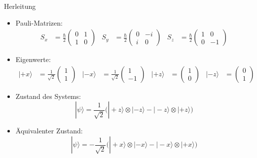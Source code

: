 \documentclass{beamer}
\begin{document}
\begin{frame}{Herleitung}
    \begin{itemize}
        \item Pauli-Matrizen:
            \begin{align*}
                S_x &= \frac{\hbar}{2} \begin{pmatrix}
                0 & 1 \\ 1 & 0
                \end{pmatrix}
                &
                S_y &= \frac{\hbar}{2} \begin{pmatrix}
                0 & -i \\ i & 0
                \end{pmatrix}
                &
                S_z &= \frac{\hbar}{2} \begin{pmatrix}
                1 & 0 \\ 0 & -1
                \end{pmatrix}\label{equ:bell:paulimatrizen}
            \end{align*}
        \item Eigenwerte:
            \begin{align*}
                |{+}x\rangle &= \frac{1}{\sqrt{2}}\begin{pmatrix} 1\\1 \end{pmatrix} &
                |{-}x\rangle &= \frac{1}{\sqrt{2}}\begin{pmatrix} 1\\-1 \end{pmatrix} &
                |{+}z\rangle &= \begin{pmatrix} 1\\0 \end{pmatrix} &
                |{-}z\rangle &= \begin{pmatrix} 0\\1 \end{pmatrix} &
            \end{align*}
        \item<2-> Zustand des Systems:
            \[
                |\psi\rangle = \frac{1}{\sqrt{2}} \Big( 
                    |{+}z\rangle \otimes |{-}z\rangle - |{-}z\rangle \otimes |{+}z\rangle
                 \Big)
            \]
        \item<3-> \"Aquivalenter Zustand:
            \[
                |\psi\rangle = -\frac{1}{\sqrt{2}} \Big( 
                              |{+}x\rangle \otimes |{-}x\rangle - |{-}x\rangle \otimes |{+}x\rangle
                           \Big)
            \]
    \end{itemize}


\end{frame}
\end{document}
